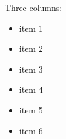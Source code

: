\documentclass[varwidth, border={-120pt 10pt 10pt 10pt}]{standalone}
\begin{document}
Three columns:
\begin{multicols}{3}
\begin{itemize}
\item item 1
\item item 2
\item item 3
\item item 4
\item item 5
\item item 6
\end{itemize}
\end{multicols}
\end{document}

